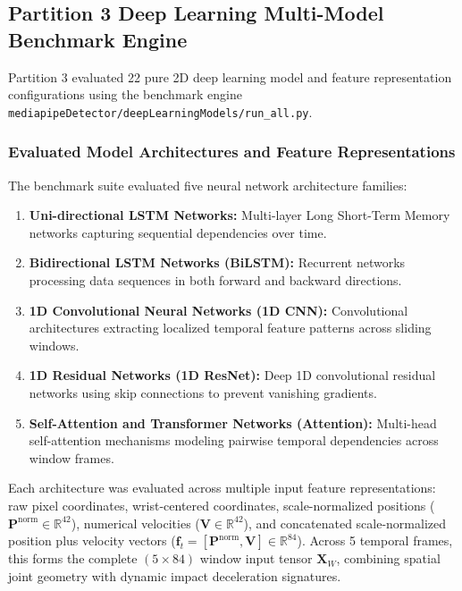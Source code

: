 \subsection{Partition 3 Deep Learning Multi-Model Benchmark Engine}
Partition 3 evaluated 22 pure 2D deep learning model and feature representation configurations using the benchmark engine \texttt{mediapipeDetector/deepLearningModels/run\_all.py}.

\subsubsection{Evaluated Model Architectures and Feature Representations}
The benchmark suite evaluated five neural network architecture families:
\begin{enumerate}
    \item \textbf{Uni-directional LSTM Networks:} Multi-layer Long Short-Term Memory networks capturing sequential dependencies over time.
    \item \textbf{Bidirectional LSTM Networks (BiLSTM):} Recurrent networks processing data sequences in both forward and backward directions.
    \item \textbf{1D Convolutional Neural Networks (1D CNN):} Convolutional architectures extracting localized temporal feature patterns across sliding windows.
    \item \textbf{1D Residual Networks (1D ResNet):} Deep 1D convolutional residual networks using skip connections to prevent vanishing gradients.
    \item \textbf{Self-Attention and Transformer Networks (Attention):} Multi-head self-attention mechanisms modeling pairwise temporal dependencies across window frames.
\end{enumerate}

Each architecture was evaluated across multiple input feature representations: raw pixel coordinates, wrist-centered coordinates, scale-normalized positions ($\mathbf{P}^{\text{norm}} \in \mathbb{R}^{42}$), numerical velocities ($\mathbf{V} \in \mathbb{R}^{42}$), and concatenated scale-normalized position plus velocity vectors ($\mathbf{f}_t = [\mathbf{P}^{\text{norm}}, \mathbf{V}] \in \mathbb{R}^{84}$). Across 5 temporal frames, this forms the complete $(5 \times 84)$ window input tensor $\mathbf{X}_W$, combining spatial joint geometry with dynamic impact deceleration signatures.

